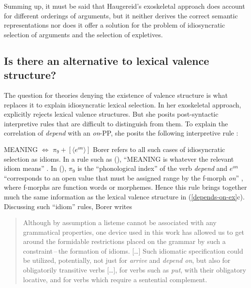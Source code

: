 \begin{exe}
\begin{xlist}[iv.]
\begin{exe}
\begin{xlist}[iv.]
Summing up, it must be said that Haugereid's exoskeletal approach does account for different
orderings of arguments, but it neither derives the correct semantic representations nor does it offer a
solution for the problem of idiosyncratic selection of arguments and the selection of expletives.

\subsection{Is there an alternative to lexical valence structure?}
\label{sec-borer}

The question for theories denying the existence of valence structure is what replaces it to explain
idiosyncratic lexical selection.  In her exoskeletal approach, \citet{Borer2005a-u} explicitly
rejects lexical valence structures.  But she posits post-syntactic interpretive rules that are
difficult to distinguish from them.  To explain the correlation of \emph{depend} with an
\emph{on}-PP, she posits the following interpretive rule \citep[Vol.\ II, p.\,29]{Borer2005a-u}:

\ea
MEANING $\Leftrightarrow$ $\pi_9 + [ \langle e^{on} \rangle ]$  
\z
Borer refers to all such cases of idiosyncratic selection as idioms.  In a rule such as (),
``MEANING is whatever the relevant idiom means'' \citep[Vol.\ II, p.\,27]{Borer2005a-u}.  In (),
$\pi_9$ is the ``phonological index'' of the verb \emph{depend} and $e^{on}$ ``corresponds to an open
value that must be assigned range by the f-morph \emph{on}'' \citep[Vol.\ II, p.\,29]{Borer2005a-u}, where f-morphs are function
words or morphemes.  Hence this rule brings together much the same information as the lexical
valence structure in (\ref{depends-on-ex}c).  Discussing such ``idiom'' rules, Borer writes  

\begin{quote}
Although by assumption a listeme cannot be associated with any grammatical properties, one device used in this work has allowed us to get around the formidable restrictions placed on the grammar by such a constraint\,--\,the formation of idioms.  [\ldots] 
Such idiomatic specification could be utilized, potentially, not just for \emph{arrive} and \emph{depend on}, but also for obligatorily transitive verbs [\ldots], for verbs such as \emph{put}, with their obligatory locative, and for verbs which require a sentential complement.


\end{quote}
\end{xlist}
\end{exe}
\end{xlist}
\end{exe}
